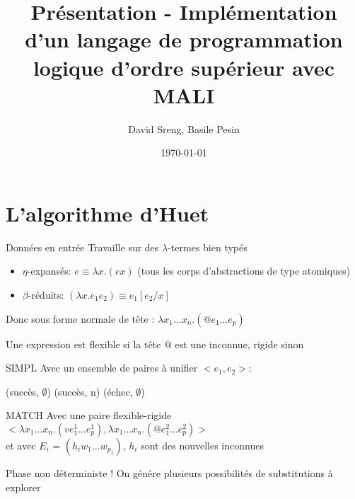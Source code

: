 \documentclass[aspectratio=169]{beamer}
\title{Présentation - Implémentation d’un langage de programmation logique d’ordre supérieur avec MALI}
\date{\today}
\author{David Sreng, Basile Pesin}
\institute{Faculté des Sciences de Sorbonne Université}
\begin{document}
\maketitle

\section{L'algorithme d'Huet}

\begin{frame}{Données en entrée}
  Travaille sur des $\lambda$-termes bien typés
  \begin{itemize}
    \item $\eta$-expansés: $e \equiv \lambda x.(e x)$ (tous les corps d'abstractions de type atomiques)
    \item $\beta$-réduits: $(\lambda x . e_1 e_2) \equiv e_1[e_2/x]$
  \end{itemize}
  Donc sous forme normale de tête : $\lambda x_1 \ldots x_n . (@ e_1 \ldots e_p)$

  Une expression est flexible si la tête $@$ est une inconnue, rigide sinon
\end{frame}

\begin{frame}{SIMPL}
  Avec un ensemble de paires à unifier $<e_1, e_2>$:
  \begin{algorithmic}
     (succès, $\emptyset$)
    \EndIf
     (succès, n)
    \EndIf
     (échec, $\emptyset$)
    \Else
    \EndIf
    \EndIf
    \EndProcedure
  \end{algorithmic}
\end{frame}

\begin{frame}{MATCH}
  Avec une paire flexible-rigide $<\lambda x_1 \ldots x_n . (v e_1^1 \ldots e_p^1), \lambda x_1 \ldots x_n . (@ e_1^2 \ldots e_p^2)>$\\
 et avec $E_i$ = $(h_i w_1 \ldots w_{p_1})$, $h_i$ sont des nouvelles inconnues
  \begin{algorithmic}
    \EndIf
    \EndFor
    \EndProcedure
  \end{algorithmic}

  Phase non déterministe ! On génére plusieurs possibilités de substitutions à explorer
\end{frame}
\end{document}
